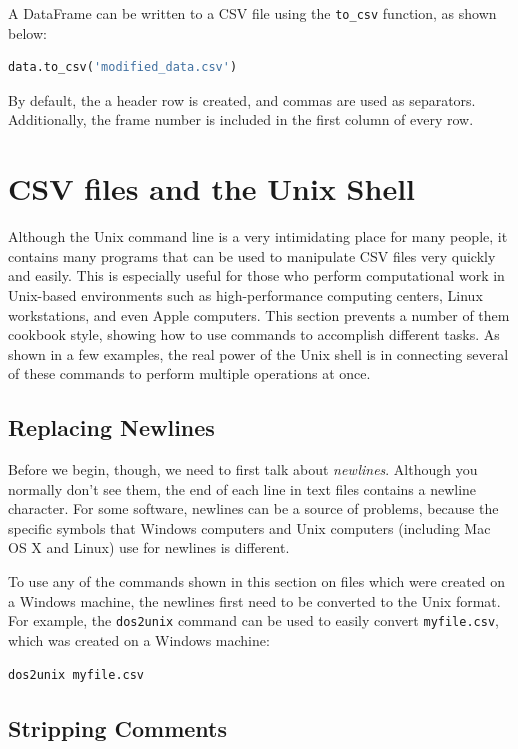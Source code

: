 A DataFrame can be written to a CSV file using the \lstinline!to_csv!
function, as shown below:

\begin{lstlisting}[language=Python]
data.to_csv('modified_data.csv')
\end{lstlisting}
By default, the a header row is created, and commas are used as
separators. Additionally, the frame number is included in the first
column of every row.

\section{CSV files and the Unix Shell}

Although the Unix command line is a very intimidating place for many
people, it contains many programs that can be used to manipulate CSV
files very quickly and easily. This is especially useful for those who
perform computational work in Unix-based environments such as
high-performance computing centers, Linux workstations, and even Apple
computers. This section prevents a number of them cookbook style,
showing how to use commands to accomplish different tasks. As shown in a
few examples, the real power of the Unix shell is in connecting several
of these commands to perform multiple operations at once.

\subsection{Replacing Newlines}

Before we begin, though, we need to first talk about \emph{newlines}.
Although you normally don't see them, the end of each line in text files
contains a newline character. For some software, newlines can be a
source of problems, because the specific symbols that Windows computers
and Unix computers (including Mac OS X and Linux) use for newlines is
different.

To use any of the commands shown in this section on files which were
created on a Windows machine, the newlines first need to be converted to
the Unix format. For example, the \lstinline!dos2unix! command can be
used to easily convert \lstinline!myfile.csv!, which was created on a
Windows machine:

\begin{lstlisting}[language=bash]
dos2unix myfile.csv
\end{lstlisting}
\subsection{Stripping Comments}

